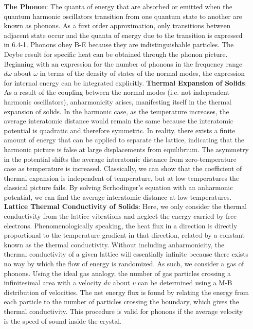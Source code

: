 \documentclass{article}
\numberwithin{equation}{section}
\begin{document}
\newline
\textbf{The Phonon}: The quanta of energy that are absorbed or emitted when the quantum harmonic oscillators transition from one quantum state to another are known as phonons. As a first order approximation, only transitions between adjacent state occur and the quanta of energy due to the transition is expressed in 6.4-1. Phonons obey B-E because they are indistinguishable particles. The Deybe result for specific heat can be obtained through the phonon picture. Beginning with an expression for the number of phonons in the frequency range $d\omega$ about $\omega$ in terms of the density of states of the normal modes, the expression for internal energy can be integrated explicitly. 
\newline
\textbf{Thermal Expansion of Solids}: As a result of the coupling between the normal modes (i.e. not independent harmonic oscillators), anharmonicity arises, manifesting itself in the thermal expansion of solids. In the harmonic case, as the temperature increases, the average interatomic distance would remain the same because the interatomic potential is quadratic and therefore symmetric. In reality, there exists a finite amount of energy that can be applied to separate the lattice, indicating that the harmonic picture is false at large displacements from equilibrium. The asymmetry in the potential shifts the average interatomic distance from zero-temperature case as temperature is increased. Classically, we can show that the coefficient of thermal expansion is independent of temperature, but at low temperatures the classical picture fails. By solving Scrhodinger's equation with an anharmonic potential, we can find the average interatomic distance at low temperatures.
\newline
\textbf{Lattice Thermal Conductivity of Solids}: Here, we only consider the thermal conductivity from the lattice vibrations and neglect the energy carried by free electrons. Phenomenologically speaking, the heat flux in a direction is directly proportional to the temperature gradient in that direction, related by a constant known as the thermal conductivity. Without including anharmonicity, the thermal conductivity of a given lattice will essentially infinite because there exists no way by which the flow of energy is randomized. As such, we consider a gas of phonons. Using the ideal gas analogy, the number of gas particles crossing a infinitesimal area with a velocity $dv$ about $v$ can be determined using a M-B distribution of velocities. The net energy flux is found by relating the energy from each particle to the number of particles crossing the boundary, which gives the thermal conductivity. This procedure is valid for phonons if the average velocity is the speed of sound inside the crystal.
\newline
\end{document}
